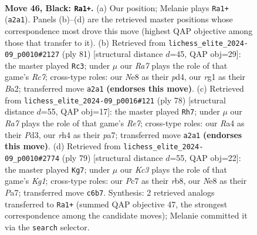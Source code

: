 \documentclass[11pt]{article}
\begin{document}
\clearpage

\begin{figure}[p]\centering
\begin{subfigure}{0.46\textwidth}\centering
\resizebox{\linewidth}{!}{%
\newchessgame
\chessboard[
  setfen={4n3/p1p5/2k2p2/8/r4P1R/8/r2B3P/2K2BR1 b - - 2 46},
  showmover=false,
  pgfstyle=straightmove, color=movearrow, markmove={a2-a1}
]}
\caption{}
\end{subfigure}\hfill
\begin{subfigure}{0.46\textwidth}\centering
\resizebox{\linewidth}{!}{%
\newchessgame
\chessboard[
  setfen={1R6/1P3pk1/6p1/8/3P3P/6P1/brr5/4R1KB b - - 0 41},
  showmover=false,
  pgfstyle=straightmove, color=movearrow, markmove={c2-c3}
]}
\caption{}
\end{subfigure}
\\[4pt]
\begin{subfigure}{0.46\textwidth}\centering
\resizebox{\linewidth}{!}{%
\newchessgame
\chessboard[
  setfen={2kr4/pp1bR3/2p5/8/1P1R4/2KP3p/P7/8 w - - 3 40},
  showmover=false,
  pgfstyle=straightmove, color=movearrow, markmove={e7-h7}
]}
\caption{}
\end{subfigure}\hfill
\begin{subfigure}{0.46\textwidth}\centering
\resizebox{\linewidth}{!}{%
\newchessgame
\chessboard[
  setfen={1R4k1/p2r1p1p/8/1P2n3/8/1B6/P6P/5K2 b - - 2 40},
  showmover=false,
  pgfstyle=straightmove, color=movearrow, markmove={g8-g7}
]}
\caption{}
\end{subfigure}
\caption{\textbf{Move 46, Black: \texttt{Ra1+}.} (a) Our position; Melanie plays \texttt{Ra1+} (\texttt{a2a1}). Panels (b)--(d) are the retrieved master positions whose correspondence most drove this move (highest QAP objective among those that transfer to it). (b) Retrieved from \texttt{lichess\_elite\_2024-09\_p0010\#2127} (ply 81) [structural distance $d$=45, QAP obj=29]: the master played \texttt{Rc3}; under $\mu$ our \emph{Ra7} plays the role of that game's \emph{Rc7}; cross-type roles: our \emph{N}e8 as their \emph{p}d4, our \emph{r}g1 as their \emph{B}a2; transferred move \texttt{a2a1} \textbf{(endorses this move)}. (c) Retrieved from \texttt{lichess\_elite\_2024-09\_p0016\#121} (ply 78) [structural distance $d$=55, QAP obj=17]: the master played \texttt{Rh7}; under $\mu$ our \emph{Ra7} plays the role of that game's \emph{Re7}; cross-type roles: our \emph{R}a4 as their \emph{P}d3, our \emph{r}h4 as their \emph{p}a7; transferred move \texttt{a2a1} \textbf{(endorses this move)}. (d) Retrieved from \texttt{lichess\_elite\_2024-09\_p0010\#2774} (ply 79) [structural distance $d$=55, QAP obj=22]: the master played \texttt{Kg7}; under $\mu$ our \emph{Kc3} plays the role of that game's \emph{Kg1}; cross-type roles: our \emph{P}c7 as their \emph{r}b8, our \emph{N}e8 as their \emph{P}a7; transferred move \texttt{c6b7}. Synthesis: 2 retrieved analogs transferred to \texttt{Ra1+} (summed QAP objective 47, the strongest correspondence among the candidate moves); Melanie committed it via the \texttt{search} selector.}
\label{fig:thought-m91}
\end{figure}
\end{document}
